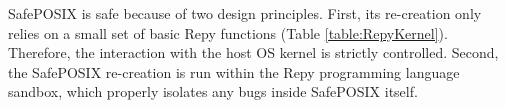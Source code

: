 SafePOSIX is safe because of two design principles.
First, its re-creation only relies on a small set of basic Repy functions (Table \ref{table:RepyKernel}).
Therefore, the interaction with the host OS kernel is strictly controlled.
Second, the SafePOSIX re-creation is run within the Repy programming language sandbox,
which properly isolates any bugs inside SafePOSIX itself.




